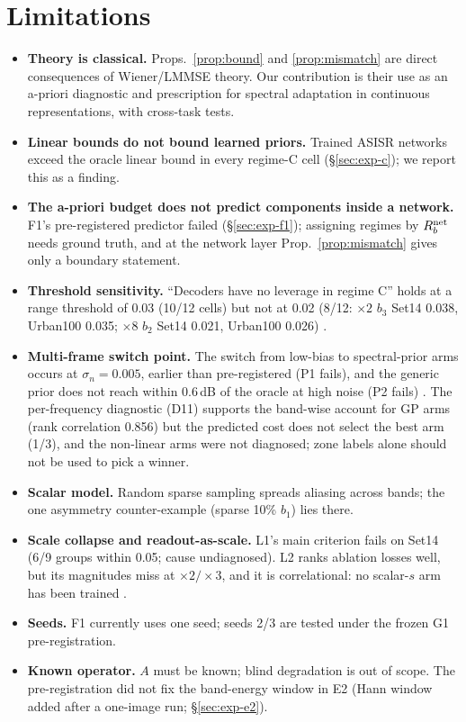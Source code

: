 \section{Limitations}\label{sec:limits}

\begin{itemize}
\item \textbf{Theory is classical.} Props.~\ref{prop:bound} and
\ref{prop:mismatch} are direct consequences of Wiener/LMMSE theory. Our
contribution is their use as an a-priori diagnostic and prescription for
spectral adaptation in continuous representations, with cross-task tests.
\item \textbf{Linear bounds do not bound learned priors.} Trained ASISR
networks exceed the oracle linear bound in every regime-C cell
(\S\ref{sec:exp-c}); we report this as a finding.
\item \textbf{The a-priori budget does not predict components inside a
network.} F1's pre-registered predictor failed (\S\ref{sec:exp-f1});
assigning regimes by $R_b^{\mathrm{net}}$ needs ground truth, and at the network layer
Prop.~\ref{prop:mismatch} gives only a boundary statement.
\item \textbf{Threshold sensitivity.} ``Decoders have no leverage in regime C''
holds at a range threshold of 0.03 (10/12 cells) but not at 0.02 (8/12:
$\times2$ $b_3$ Set14 0.038, Urban100 0.035; $\times8$ $b_2$ Set14 0.021,
Urban100 0.026) . 
\item \textbf{Multi-frame switch point.} The switch from low-bias to
spectral-prior arms occurs at $\sigma_n=0.005$, earlier than pre-registered
(P1 fails), and the generic prior does not reach within 0.6\,dB of the oracle
at high noise (P2 fails) . The per-frequency diagnostic
(D11) supports the band-wise account for GP arms (rank correlation 0.856) but
the predicted cost does not select the best arm (1/3), and the non-linear arms
were not diagnosed; zone labels alone should not be used to pick a winner.
\item \textbf{Scalar model.} Random sparse sampling spreads aliasing across
bands; the one asymmetry counter-example (sparse 10\% $b_1$) lies there.
\item \textbf{Scale collapse and readout-as-scale.} L1's main criterion fails
on Set14 (6/9 groups within 0.05; cause undiagnosed). L2 ranks ablation
losses well, but its magnitudes miss at $\times2/\times3$, and it is
correlational: no scalar-$s$ arm has been trained .
\item \textbf{Seeds.} F1 currently uses one seed; seeds 2/3 are tested under
the frozen G1 pre-registration. 
\item \textbf{Known operator.} $A$ must be known; blind degradation is out of
scope. The pre-registration did not fix the band-energy window in E2 (Hann
window added after a one-image run; \S\ref{sec:exp-e2}).
\end{itemize}

